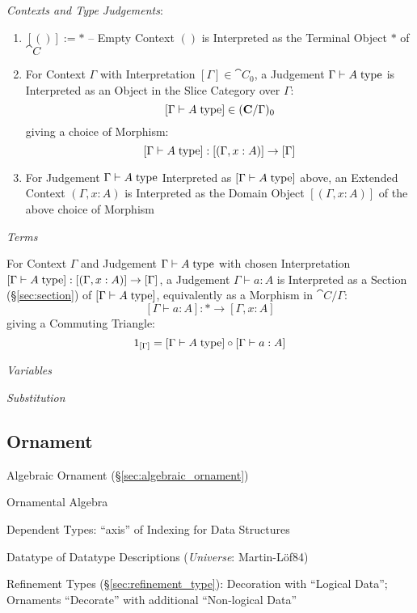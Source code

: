 \emph{Contexts and Type Judgements}:
\begin{enumerate}
  \item $[()] := *$ -- Empty Context $()$ is Interpreted as the
    Terminal Object $*$ of $\cat{C}$
  \item For Context $\Gamma$ with Interpretation $[\Gamma] \in
    \cat{C}_0$, a Judgement $\Gamma \vdash A\;\mathrm{type}$ is Interpreted
    as an Object in the Slice Category over $\Gamma$:
    \[
      [\Gamma \vdash A\;\mathrm{type}] \in (\mathbf{C}/\Gamma)_0
    \]
    giving a choice of Morphism:
    \[
      [\Gamma \vdash A\;\mathrm{type}] : [(\Gamma,x:A)] \rightarrow [\Gamma]
    \]
  \item For Judgement $\Gamma \vdash A\;\mathrm{type}$ Interpreted as $[\Gamma
    \vdash A\;\mathrm{type}]$ above, an Extended Context $(\Gamma,x:A)$ is
    Interpreted as the Domain Object $[(\Gamma,x:A)]$ of the above
    choice of Morphism
\end{enumerate}

\emph{Terms}

For Context $\Gamma$ and Judgement $\Gamma \vdash A\;\mathrm{type}$ with chosen
Interpretation $[\Gamma \vdash A\;\mathrm{type}] : [(\Gamma,x:A)] \rightarrow
[\Gamma]$, a Judgement $\Gamma \vdash a:A$ is Interpreted as a Section
(\S\ref{sec:section}) of $[\Gamma \vdash A\;\mathrm{type}]$, equivalently as a
Morphism in $\cat{C}/\Gamma$:
\[
  [\Gamma \vdash a:A]: * \rightarrow [\Gamma,x:A]
\]
giving a Commuting Triangle:
\[
  1_{[\Gamma]} = [\Gamma \vdash A\;\mathrm{type}] \circ [\Gamma \vdash a:A]
\]

\emph{Variables}

\emph{Substitution}



\subsection{Ornament}\label{sec:ornament}

\cite{mcbride13}

Algebraic Ornament (\S\ref{sec:algebraic_ornament})

Ornamental Algebra

Dependent Types: ``axis'' of Indexing for Data Structures

Datatype of Datatype Descriptions (\emph{Universe}: Martin-L\"of84)

Refinement Types (\S\ref{sec:refinement_type}): Decoration with
``Logical Data''; Ornaments ``Decorate'' with additional ``Non-logical
Data'' %



